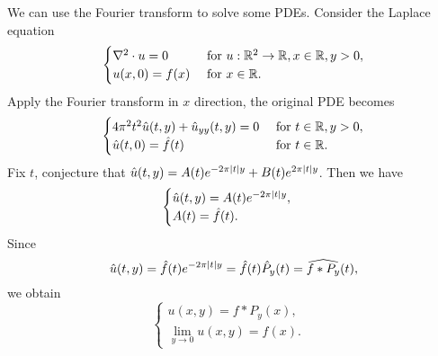 \begin{example}
    We can use the Fourier transform to solve some PDEs. Consider the Laplace 
    equation
    \begin{equation*}
        \begin{cases}
            \nabla^2\cdot u = 0 & \text{ for } u:\mathbb{R}^2\to\mathbb{R}, x\in\mathbb{R}, y>0, \\
            u(x,0) = f(x) & \text{ for } x\in\mathbb{R}. \\
        \end{cases}
    \end{equation*}
    Apply the Fourier transform in $x$ direction, the original PDE becomes
    \begin{equation*}
        \begin{cases}
            4\pi^2t^2\hat{u}(t,y) + \hat{u}_{yy}(t,y) = 0 & \text{ for } t\in\mathbb{R}, y>0, \\
            \hat{u}(t,0) = \hat{f}(t) & \text{ for } t\in\mathbb{R}. \\
        \end{cases}
    \end{equation*}
    Fix $t$, conjecture that $\hat{u}(t,y) = A(t)e^{-2\pi \left\lvert {t} \right\rvert y} + B(t)e^{2\pi \left\lvert {t} \right\rvert y}$. 
    Then we have
    \begin{equation*}
        \begin{cases}
            \hat{u}(t,y) = A(t)e^{-2\pi\left\lvert {t} \right\rvert y}, & \\
            A(t) = \hat{f}(t). &
        \end{cases}
    \end{equation*}
    Since 
    \begin{equation*}
        \hat{u}(t,y) = \hat{f}(t)e^{-2\pi\left\lvert {t} \right\rvert y} = \hat{f}(t)\hat{P}_y(t) 
        = \widehat{f*P_y}(t),
    \end{equation*}
    we obtain
    \begin{equation*}
        \begin{cases}
            u(x,y) = f*P_y(x), & \\
            \lim_{y\to 0}u(x,y) = f(x). &
        \end{cases}
    \end{equation*}
\end{example}